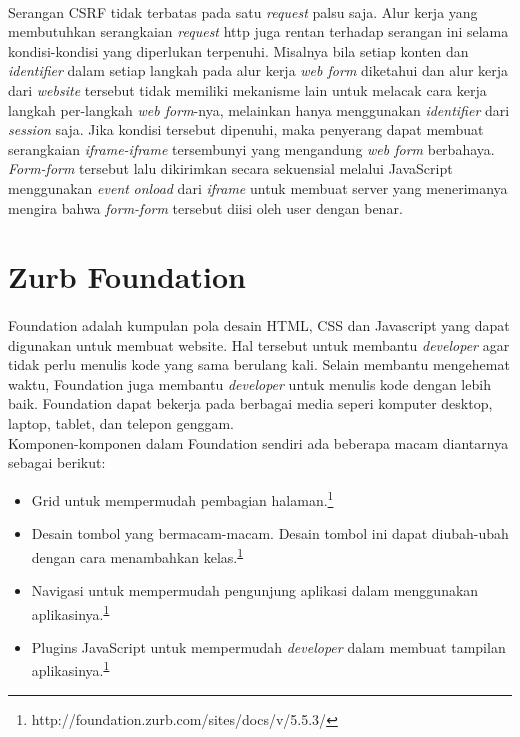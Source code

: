 \paragraph{}Serangan CSRF tidak terbatas pada satu \textit{request} palsu saja. Alur kerja yang membutuhkan serangkaian \textit{request} http juga rentan terhadap serangan ini selama kondisi-kondisi yang diperlukan terpenuhi. Misalnya bila setiap konten dan \textit{identifier} dalam setiap langkah pada alur kerja \textit{web form} diketahui dan alur kerja dari \textit{website} tersebut tidak memiliki mekanisme lain untuk melacak cara kerja langkah per-langkah \textit{web form}-nya, melainkan hanya menggunakan \textit{identifier} dari \textit{session} saja. Jika kondisi tersebut dipenuhi, maka penyerang dapat membuat serangkaian \textit{iframe-iframe} tersembunyi yang mengandung \textit{web form} berbahaya. \textit{Form-form} tersebut lalu dikirimkan secara sekuensial melalui JavaScript menggunakan \textit{event} \textit{onload} dari \textit{iframe} untuk membuat server yang menerimanya mengira bahwa \textit{form-form} tersebut diisi oleh user dengan benar. \cite{JohnsWinter2006}

\section{Zurb Foundation}
\label{zurbfoundation}

\paragraph{}  Foundation adalah kumpulan pola desain HTML, CSS dan Javascript yang dapat digunakan untuk membuat website. Hal tersebut untuk membantu \textit{developer} agar tidak perlu menulis kode yang sama berulang kali. Selain membantu mengehemat waktu, Foundation juga membantu \textit{developer} untuk menulis kode dengan lebih baik. Foundation dapat bekerja pada berbagai media seperi komputer desktop, laptop, tablet, dan telepon genggam.\cite{zurbfoundation:17} \\
Komponen-komponen dalam Foundation sendiri ada beberapa macam diantarnya sebagai berikut:

\begin{itemize}
	\item  Grid untuk mempermudah pembagian halaman.\footnote{\label{note2}http://foundation.zurb.com/sites/docs/v/5.5.3/}
	\item  Desain tombol yang bermacam-macam. Desain tombol ini dapat diubah-ubah dengan cara menambahkan kelas.\textsuperscript{\ref{note2}}
	\item  Navigasi untuk mempermudah pengunjung aplikasi dalam menggunakan aplikasinya.\textsuperscript{\ref{note2}}
	\item  Plugins JavaScript untuk mempermudah \textit{developer} dalam membuat tampilan aplikasinya.\textsuperscript{\ref{note2}}
\end{itemize}

